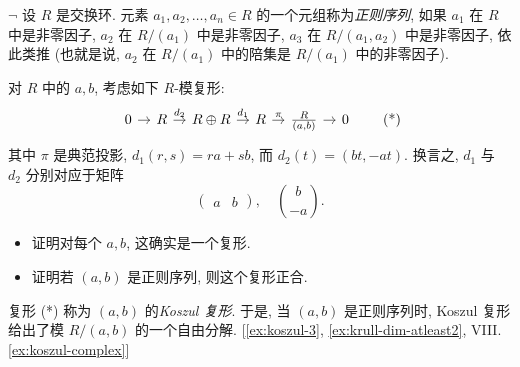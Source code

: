 \begin{prob}\label{ex:koszul-2}
$\neg$ 设 $R$ 是交换环. 元素 $a_1,a_2,\ldots,a_n\in R$ 的一个元组称为\emph{正则序列}, 如果 $a_1$ 在 $R$ 中是非零因子, $a_2$ 在 $R/(a_1)$ 中是非零因子, $a_3$ 在 $R/(a_1,a_2)$ 中是非零因子, 依此类推 (也就是说, $a_2$ 在 $R/(a_1)$ 中的陪集是 $R/(a_1)$ 中的非零因子).

对 $R$ 中的 $a,b$, 考虑如下 $R$-模复形:
\begin{equation}\begin{tikzcd}[column sep=.9em]
0 \ar[r] & R \ar[r,"d_2"] & R\oplus R \ar[r,"d_1"] & R \ar[r,"\pi"] & \frac{R}{(a,b)} \ar[r] & 0
\end{tikzcd}\tag{*}\end{equation}
其中 $\pi$ 是典范投影, $d_1(r,s)=ra+sb$, 而 $d_2(t)=(bt,-at)$. 换言之, $d_1$ 与 $d_2$ 分别对应于矩阵
$$
\begin{pmatrix} a & b \end{pmatrix},\quad \binom{b}{-a}.
$$

\begin{itemize}
\item 证明对每个 $a,b$, 这确实是一个复形.
\item 证明若 $(a,b)$ 是正则序列, 则这个复形正合.
\end{itemize}

复形 (*) 称为 $(a,b)$ 的\emph{Koszul 复形}. 于是, 当 $(a,b)$ 是正则序列时, Koszul 复形给出了模 $R/(a,b)$ 的一个自由分解. [\ref{ex:koszul-3}, \ref{ex:krull-dim-atleast2}, VIII.\ref{ex:koszul-complex}]
\end{prob}

